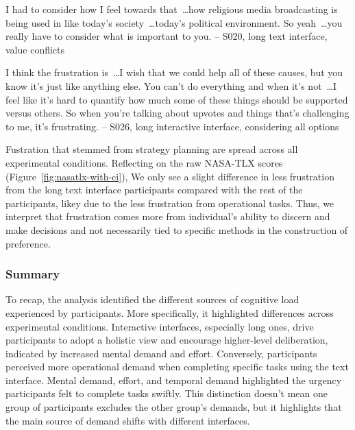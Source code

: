 \begin{displayquote}
I had to consider how I feel towards that~\ldots how religious media broadcasting is being used in like today's society~\ldots today's political environment. So yeah~\ldots you really have to consider what is important to you. 
\noindent \hfill -- S020, long text interface, value conflicts
\end{displayquote}

\begin{displayquote}
I think the frustration is~\ldots I wish that we could help all of these causes, but you know it's just like anything else. You can't do everything and when it's not~\ldots  I feel like it's hard to quantify how much some of these things should be supported versus others. So when you're talking about upvotes and things that's challenging to me, it's frustrating.
\noindent \hfill -- S026, long interactive interface, considering all options
\end{displayquote}

Fustration that stemmed from strategy planning are spread across all experimental conditions. Reflecting on the raw NASA-TLX scores (Figure~\ref{fig:nasatlx-with-ci}), We only see a slight difference in less frustration from the long text interface participants compared with the rest of the participants, likey due to the less frustration from operational tasks. Thus, we interpret that frustration comes more from individual's ability to discern and make decisions and not necessarily tied to specific methods in the construction of preference.

\subsubsection{Summary}
To recap, the analysis identified the different sources of cognitive load experienced by participants. More specifically, it highlighted differences across experimental conditions. Interactive interfaces, especially long ones, drive participants to adopt a holistic view and encourage higher-level deliberation, indicated by increased mental demand and effort. Conversely, participants perceived more operational demand when completing specific tasks using the text interface. Mental demand, effort, and temporal demand highlighted the urgency participants felt to complete tasks swiftly. This distinction doesn't mean one group of participants excludes the other group's demands, but it highlights that the main source of demand shifts with different interfaces.

